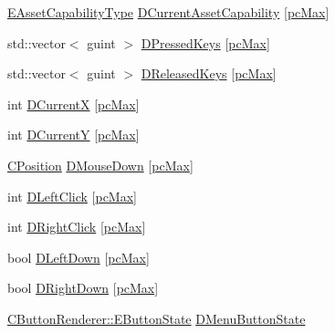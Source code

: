 \begin{DoxyCompactItemize}
\item 
\hyperlink{GameDataTypes_8h_a35b98ce26aca678b03c6f9f76e4778ce}{E\+Asset\+Capability\+Type} \hyperlink{classCApplicationData_a7e0dbfdc54f73dfa9838ae81b8017e2d}{D\+Current\+Asset\+Capability} \mbox{[}\hyperlink{GameDataTypes_8h_aafb0ca75933357ff28a6d7efbdd7602fa594a5c8dd3987f24e8a0f23f1a72cd34}{pc\+Max}\mbox{]}
\item 
std\+::vector$<$ guint $>$ \hyperlink{classCApplicationData_ac6f50c764f7561c0bd2a9fbce55b2701}{D\+Pressed\+Keys} \mbox{[}\hyperlink{GameDataTypes_8h_aafb0ca75933357ff28a6d7efbdd7602fa594a5c8dd3987f24e8a0f23f1a72cd34}{pc\+Max}\mbox{]}
\item 
std\+::vector$<$ guint $>$ \hyperlink{classCApplicationData_adcef59167cadd8ee516884a7c0df08f6}{D\+Released\+Keys} \mbox{[}\hyperlink{GameDataTypes_8h_aafb0ca75933357ff28a6d7efbdd7602fa594a5c8dd3987f24e8a0f23f1a72cd34}{pc\+Max}\mbox{]}
\item 
int \hyperlink{classCApplicationData_a1dc7ee482a39f7978c71365ac540f97a}{D\+CurrentX} \mbox{[}\hyperlink{GameDataTypes_8h_aafb0ca75933357ff28a6d7efbdd7602fa594a5c8dd3987f24e8a0f23f1a72cd34}{pc\+Max}\mbox{]}
\item 
int \hyperlink{classCApplicationData_a0ba39779ae11c8072258c6ddfebd6052}{D\+CurrentY} \mbox{[}\hyperlink{GameDataTypes_8h_aafb0ca75933357ff28a6d7efbdd7602fa594a5c8dd3987f24e8a0f23f1a72cd34}{pc\+Max}\mbox{]}
\item 
\hyperlink{classCPosition}{C\+Position} \hyperlink{classCApplicationData_ad7a43a29e7906e44f09347850796a915}{D\+Mouse\+Down} \mbox{[}\hyperlink{GameDataTypes_8h_aafb0ca75933357ff28a6d7efbdd7602fa594a5c8dd3987f24e8a0f23f1a72cd34}{pc\+Max}\mbox{]}
\item 
int \hyperlink{classCApplicationData_a8a86bb4c7cba7b119121401dda4ca68b}{D\+Left\+Click} \mbox{[}\hyperlink{GameDataTypes_8h_aafb0ca75933357ff28a6d7efbdd7602fa594a5c8dd3987f24e8a0f23f1a72cd34}{pc\+Max}\mbox{]}
\item 
int \hyperlink{classCApplicationData_a845b854113fb8742338ada01af8b9351}{D\+Right\+Click} \mbox{[}\hyperlink{GameDataTypes_8h_aafb0ca75933357ff28a6d7efbdd7602fa594a5c8dd3987f24e8a0f23f1a72cd34}{pc\+Max}\mbox{]}
\item 
bool \hyperlink{classCApplicationData_a2b943f18557c3e4c8cd4550e22e028b6}{D\+Left\+Down} \mbox{[}\hyperlink{GameDataTypes_8h_aafb0ca75933357ff28a6d7efbdd7602fa594a5c8dd3987f24e8a0f23f1a72cd34}{pc\+Max}\mbox{]}
\item 
bool \hyperlink{classCApplicationData_a0eb2ef18b6e71e98517f8b813a658164}{D\+Right\+Down} \mbox{[}\hyperlink{GameDataTypes_8h_aafb0ca75933357ff28a6d7efbdd7602fa594a5c8dd3987f24e8a0f23f1a72cd34}{pc\+Max}\mbox{]}
\item 
\hyperlink{classCButtonRenderer_ae0eccda184600f6e14bfd59033e5e9a1}{C\+Button\+Renderer\+::\+E\+Button\+State} \hyperlink{classCApplicationData_a92e86e12efc0c3246550b3043b892bea}{D\+Menu\+Button\+State}
\end{DoxyCompactItemize}


